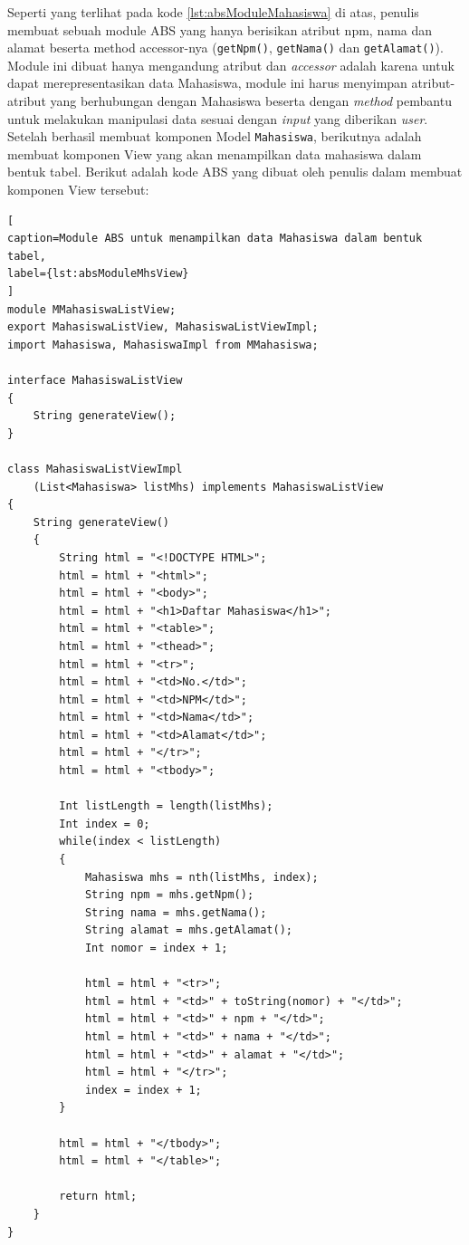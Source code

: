 Seperti yang terlihat pada kode \ref{lst:absModuleMahasiswa} di atas, penulis membuat sebuah module ABS yang hanya berisikan atribut npm, nama dan alamat beserta method accessor-nya (\texttt{getNpm()}, \texttt{getNama()} dan \texttt{getAlamat()}). Module ini dibuat hanya mengandung atribut dan \textit{accessor} adalah karena untuk dapat merepresentasikan data Mahasiswa, module ini harus menyimpan atribut-atribut yang berhubungan dengan Mahasiswa beserta dengan \textit{method} pembantu untuk melakukan manipulasi data sesuai dengan \textit{input} yang diberikan \textit{user}.\\

Setelah berhasil membuat komponen Model \texttt{Mahasiswa}, berikutnya adalah membuat komponen View yang akan menampilkan data mahasiswa dalam bentuk tabel. Berikut adalah kode ABS yang dibuat oleh penulis dalam membuat komponen View tersebut:

\begin{lstlisting}[
caption=Module ABS untuk menampilkan data Mahasiswa dalam bentuk tabel,
label={lst:absModuleMhsView}
]
module MMahasiswaListView;
export MahasiswaListView, MahasiswaListViewImpl;
import Mahasiswa, MahasiswaImpl from MMahasiswa;

interface MahasiswaListView
{
	String generateView();
}

class MahasiswaListViewImpl
	(List<Mahasiswa> listMhs) implements MahasiswaListView
{
	String generateView()
	{
		String html = "<!DOCTYPE HTML>";
		html = html + "<html>";
		html = html + "<body>";
		html = html + "<h1>Daftar Mahasiswa</h1>";
		html = html + "<table>";
		html = html + "<thead>";
		html = html + "<tr>";
		html = html + "<td>No.</td>";
		html = html + "<td>NPM</td>";
		html = html + "<td>Nama</td>";
		html = html + "<td>Alamat</td>";
		html = html + "</tr>";
		html = html + "<tbody>";
		
		Int listLength = length(listMhs);
		Int index = 0;
		while(index < listLength)
		{
			Mahasiswa mhs = nth(listMhs, index);
			String npm = mhs.getNpm();
			String nama = mhs.getNama();
			String alamat = mhs.getAlamat();
			Int nomor = index + 1;
			
			html = html + "<tr>";
			html = html + "<td>" + toString(nomor) + "</td>";
			html = html + "<td>" + npm + "</td>";
			html = html + "<td>" + nama + "</td>";
			html = html + "<td>" + alamat + "</td>";
			html = html + "</tr>";
			index = index + 1;
		}
		
		html = html + "</tbody>";
		html = html + "</table>";
		
		return html;
	}
}
\end{lstlisting}

